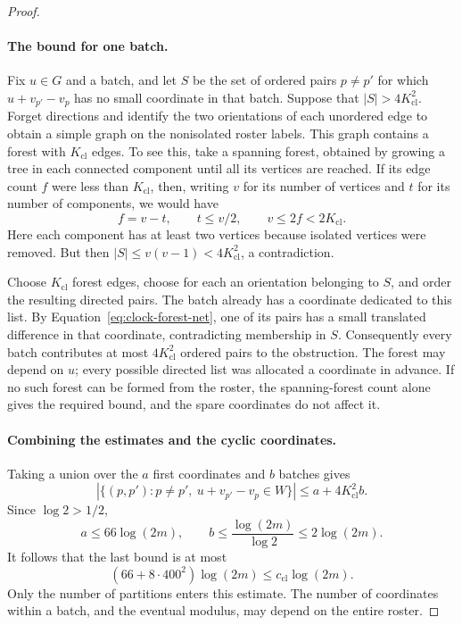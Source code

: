\begin{proof}
\paragraph{The bound for one batch.}
Fix $u\in G$ and a batch, and let $S$ be the set of ordered pairs
$p\ne p'$ for which $u+v_{p'}-v_p$ has no small coordinate in that
batch.  Suppose that $|S|>4K_{\mathrm{cl}}^2$.
Forget directions and identify the two orientations of each unordered
edge to obtain a simple graph on the nonisolated roster labels.
This graph contains a forest with
$K_{\mathrm{cl}}$ edges.  To see this, take a spanning forest, obtained
by growing a tree in each connected component until all its vertices
are reached.  If its edge count $f$ were less than $K_{\mathrm{cl}}$,
then, writing $v$ for its number of vertices and $t$ for its number of
components, we would have
\[
 f=v-t,\qquad t\le v/2,\qquad v\le2f<2K_{\mathrm{cl}}.
\]
Here each component has at least two vertices because isolated
vertices were removed.  But then
$|S|\le v(v-1)<4K_{\mathrm{cl}}^2$, a contradiction.

Choose $K_{\mathrm{cl}}$ forest edges, choose for each an orientation
belonging to $S$, and order the resulting directed pairs.  The batch
already has a coordinate dedicated to this list.  By
Equation~\eqref{eq:clock-forest-net}, one of its pairs has a small translated
difference in that coordinate, contradicting membership in $S$.
Consequently every batch contributes at most $4K_{\mathrm{cl}}^2$
ordered pairs to the obstruction.  The forest may depend on $u$;
every possible directed list was allocated a coordinate in advance.
If no such forest can be formed from the roster, the spanning-forest
count alone gives the required bound, and the spare coordinates do
not affect it.

\paragraph{Combining the estimates and the cyclic coordinates.}
Taking a union over the $a$ first coordinates and $b$ batches gives
\[
 \left|\{(p,p'):p\ne p',\ u+v_{p'}-v_p\in W\}\right|
 \le a+4K_{\mathrm{cl}}^2b.
\]
Since $\log 2>1/2$,
\[
 a\le66\log(2m),\qquad
 b\le\frac{\log(2m)}{\log2}\le2\log(2m).
\]
It follows that the last bound is at most
\[
 (66+8\cdot400^2)\log(2m)
 \le c_{\mathrm{cl}}\log(2m).
\]
Only the number of partitions enters this estimate.  The number of
coordinates within a batch, and the eventual modulus, may depend on
the entire roster.


\end{proof}
